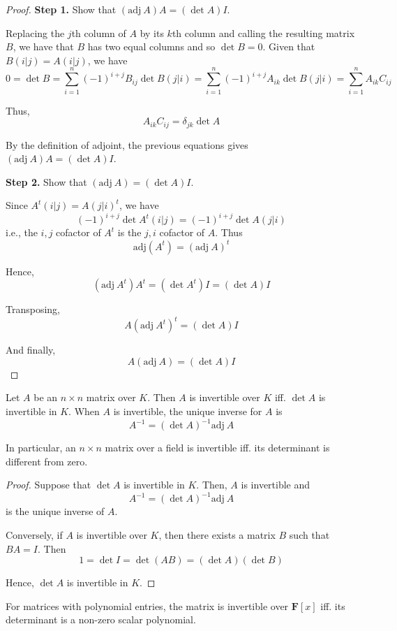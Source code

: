 \begin{proof}

	\textbf{Step 1.} Show that $(\text{adj} ~A)A = (\det A)I$.
	
	Replacing the $j$th column of $A$ by its $k$th column and calling the resulting matrix $B$, we have that $B$ has two equal columns and so $\det B = 0$. Given that $B(i|j) = A(i|j)$, we have
	\[
		0 = \det B = \sum_{i=1}^n (-1)^{i+j} B_{ij} \det B(j|i) = \sum_{i=1}^n (-1)^{i+j} A_{ik} \det B(j|i) = \sum_{i=1}^n A_{ik} C_{ij}
	\]
	
	Thus,
	\[
		A_{ik} C_{ij} = \delta_{jk} \det A
	\]
	
	By the definition of adjoint, the previous equations gives $(\text{adj} ~A)A = (\det A)I$.
	
	\textbf{Step 2.} Show that $(\text{adj} ~A) = (\det A)I$.

	Since $A^t(i|j) = A(j|i)^t$, we have
	\[
		(-1)^{i+j} \det A^t(i|j) = (-1)^{i+j} \det A(j|i)
	\]
	i.e., the $i,j$ cofactor of $A^t$ is the $j, i$ cofactor of $A$. Thus
	\[
		\text{adj}(A^t) = (\text{adj}~A)^t
	\]
	
	Hence,
	\[
		(\text{adj}~A^t)A^t = (\det A^t) I = (\det A)I 
	\]
	
	Transposing,
	\[
		A(\text{adj}~A^t)^t = (\det A)I 
	\]
	
	And finally,
	\[
		A(\text{adj}~A) = (\det A)I
	\]
\end{proof}

\begin{theorem}
	Let $A$ be an $n \times n$ matrix over $K$. Then $A$ is invertible over $K$ iff. $\det A$ is invertible in $K$. When $A$ is invertible, the unique inverse for $A$ is
	\[
		A^{-1} = (\det A)^{-1} \text{adj}~A
	\]
	
	In particular, an $n \times n$ matrix over a field is invertible iff. its determinant is different from zero.
\end{theorem}

\begin{proof}
	Suppose that $\det A$ is invertible in $K$. Then, $A$ is invertible and
	\[
		A^{-1} = (\det A)^{-1} \text{adj}~A
	\]
	is the unique inverse of $A$.
	
	Conversely, if $A$ is invertible over $K$, then there exists a matrix $B$ such that $BA = I$. Then
	\[
		1 = \det I = \det (AB) = (\det A)(\det B)
	\]
	
	Hence, $\det A$ is invertible in $K$.
\end{proof}

\begin{remark}
	For matrices with polynomial entries, the matrix is invertible over $\textbf{F}[x]$ iff. its determinant is a non-zero scalar polynomial.
\end{remark}

